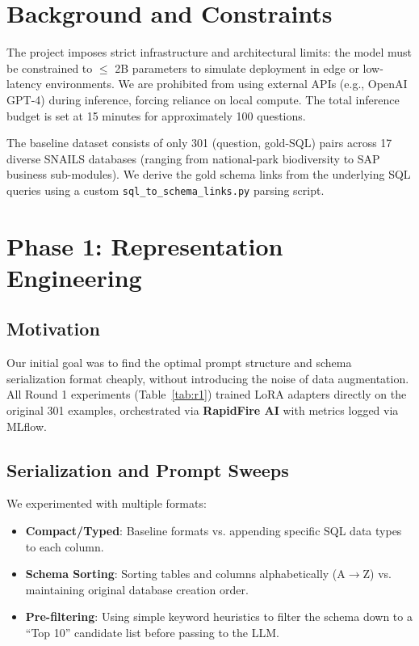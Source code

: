 \documentclass[10pt,twocolumn]{article}
\begin{document}
\section{Background and Constraints}
\label{sec:background}

The project imposes strict infrastructure and architectural limits: the model must be constrained to $\le$ 2B parameters to simulate deployment in edge or low-latency environments. We are prohibited from using external APIs (e.g., OpenAI GPT-4) during inference, forcing reliance on local compute. The total inference budget is set at 15 minutes for approximately 100 questions. 

The baseline dataset consists of only 301 (question, gold-SQL) pairs across 17 diverse SNAILS databases (ranging from national-park biodiversity to SAP business sub-modules). We derive the gold schema links from the underlying SQL queries using a custom \texttt{sql\_to\_schema\_links.py} parsing script.

\section{Phase 1: Representation Engineering}
\label{sec:phase1}

\subsection{Motivation}
Our initial goal was to find the optimal prompt structure and schema serialization format cheaply, without introducing the noise of data augmentation. All Round 1 experiments (Table~\ref{tab:r1}) trained LoRA adapters directly on the original 301 examples, orchestrated via \textbf{RapidFire AI} with metrics logged via MLflow.

\subsection{Serialization and Prompt Sweeps}
We experimented with multiple formats:
\begin{itemize}[leftmargin=*,noitemsep]
  \item \textbf{Compact/Typed}: Baseline formats vs. appending specific SQL data types to each column.
  \item \textbf{Schema Sorting}: Sorting tables and columns alphabetically (A$\to$Z) vs. maintaining original database creation order.
  \item \textbf{Pre-filtering}: Using simple keyword heuristics to filter the schema down to a ``Top 10'' candidate list before passing to the LLM.
\end{itemize}
\end{document}
